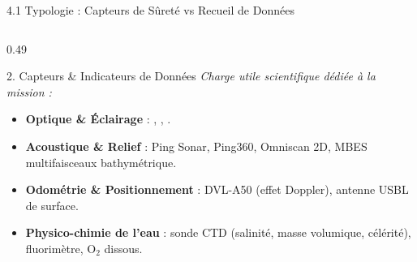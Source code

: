 \begin{frame}{4.1 Typologie : Capteurs de Sûreté vs Recueil de Données}
\begin{columns}[T]
    \begin{column}{0.49\textwidth}
      \begin{exampleblock}{2. Capteurs \& Indicateurs de Données}
        \scriptsize
        \textit{Charge utile scientifique dédiée à la mission :}
        \begin{itemize}
          \item \textbf{Optique \& Éclairage} : , , .
          \item \textbf{Acoustique \& Relief} : Ping Sonar, Ping360, Omniscan 2D, MBES multifaisceaux bathymétrique.
          \item \textbf{Odométrie \& Positionnement} : DVL-A50 (effet Doppler), antenne USBL de surface.
          \item \textbf{Physico-chimie de l'eau} : sonde CTD (salinité, masse volumique, célérité), fluorimètre, $\text{O}_2$ dissous.
        \end{itemize}
      \end{exampleblock}
    \end{column}
  \end{columns}
\end{frame}

